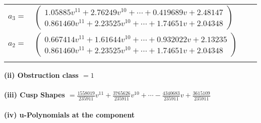 \documentclass[1p]{elsarticle_modified}
\theoremstyle{definition}
\begin{document}
\begin{tabular}{m{7pt} m{180pt} m{7pt} m{180pt} }
\flushright $a_{3}=$&$\begin{pmatrix}1.05885 v^{11}+2.76249 v^{10}+\cdots+0.419689 v+2.48147\\0.861460 v^{11}+2.23525 v^{10}+\cdots+1.74651 v+2.04348\end{pmatrix}$ \\
\flushright $a_{2}=$&$\begin{pmatrix}0.667414 v^{11}+1.61644 v^{10}+\cdots+0.932022 v+2.13235\\0.861460 v^{11}+2.23525 v^{10}+\cdots+1.74651 v+2.04348\end{pmatrix}$\\&\end{tabular}
\flushleft \textbf{(ii) Obstruction class $= 1$}\\~\\
\flushleft \textbf{(iii) Cusp Shapes $= \frac{1558019}{235911} v^{11}+\frac{3765626}{235911} v^{10}+\cdots-\frac{4340683}{235911} v+\frac{3615109}{235911}$}\\~\\
\newpage\renewcommand{\arraystretch}{1}
\flushleft \textbf{(iv) u-Polynomials at the component}\newline \\
\end{document}
